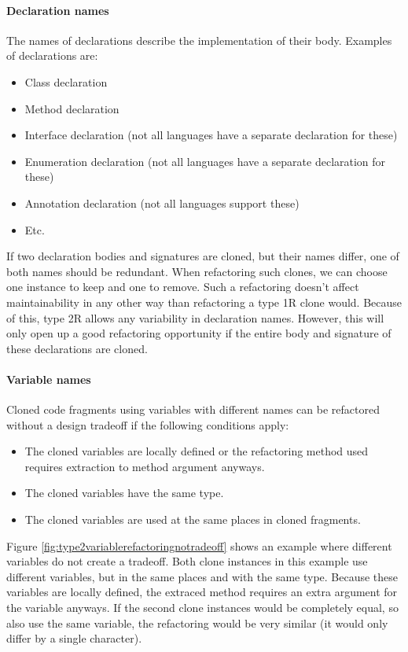\paragraph{Declaration names}
The names of declarations describe the implementation of their body. Examples of declarations are:
\begin{itemize}
  \item Class declaration
  \item Method declaration
  \item Interface declaration (not all languages have a separate declaration for these)
  \item Enumeration declaration (not all languages have a separate declaration for these)
  \item Annotation declaration (not all languages support these)
  \item Etc.
\end{itemize}
If two declaration bodies and signatures are cloned, but their names differ, one of both names should be redundant. When refactoring such clones, we can choose one instance to keep and one to remove. Such a refactoring doesn't affect maintainability in any other way than refactoring a type 1R clone would. Because of this, type 2R allows any variability in declaration names. However, this will only open up a good refactoring opportunity if the entire body and signature of these declarations are cloned.

\paragraph{Variable names}
Cloned code fragments using variables with different names can be refactored without a design tradeoff if the following conditions apply:

\begin{itemize}
  \item The cloned variables are locally defined or the refactoring method used requires extraction to method argument anyways.
  \item The cloned variables have the same type.
  \item The cloned variables are used at the same places in cloned fragments.
\end{itemize}

Figure \ref{fig:type2variablerefactoringnotradeoff} shows an example where different variables do not create a tradeoff. Both clone instances in this example use different variables, but in the same places and with the same type. Because these variables are locally defined, the extraced method requires an extra argument for the variable anyways. If the second clone instances would be completely equal, so also use the same variable, the refactoring would be very similar (it would only differ by a single character).


